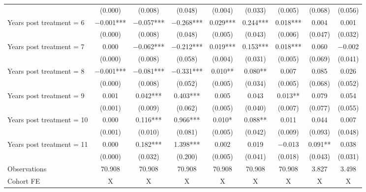 \begin{table}[H]
{\begin{threeparttable}
\begin{tabular}[t]{lcccccccc}
 & (\num{0.000}) & (\num{0.008}) & (\num{0.048}) & (\num{0.004}) & (\num{0.033}) & (\num{0.005}) & (\num{0.068}) & (\num{0.056})\\
Years post treatment = 6 & \num{-0.001}*** & \num{-0.057}*** & \num{-0.268}*** & \num{ 0.029}*** & \num{ 0.244}*** & \num{ 0.018}*** & \num{ 0.004} & \num{ 0.001}\\
 & (\num{0.000}) & (\num{0.008}) & (\num{0.048}) & (\num{0.005}) & (\num{0.043}) & (\num{0.006}) & (\num{0.047}) & (\num{0.032})\\
Years post treatment = 7 & \num{ 0.000} & \num{-0.062}*** & \num{-0.212}*** & \num{ 0.019}*** & \num{ 0.153}*** & \num{ 0.018}*** & \num{ 0.060} & \num{-0.002}\\
 & (\num{0.000}) & (\num{0.008}) & (\num{0.058}) & (\num{0.004}) & (\num{0.031}) & (\num{0.005}) & (\num{0.069}) & (\num{0.041})\\
Years post treatment = 8 & \num{-0.001}*** & \num{-0.081}*** & \num{-0.331}*** & \num{ 0.010}** & \num{ 0.080}** & \num{ 0.007} & \num{ 0.085} & \num{ 0.026}\\
 & (\num{0.000}) & (\num{0.008}) & (\num{0.052}) & (\num{0.005}) & (\num{0.034}) & (\num{0.005}) & (\num{0.068}) & (\num{0.052})\\
Years post treatment = 9 & \num{ 0.001} & \num{ 0.042}*** & \num{ 0.403}*** & \num{ 0.005} & \num{ 0.043} & \num{ 0.013}** & \num{ 0.079} & \num{ 0.054}\\
 & (\num{0.001}) & (\num{0.009}) & (\num{0.062}) & (\num{0.005}) & (\num{0.040}) & (\num{0.007}) & (\num{0.077}) & (\num{0.055})\\
Years post treatment = 10 & \num{ 0.000} & \num{ 0.116}*** & \num{ 0.966}*** & \num{ 0.010}* & \num{ 0.088}** & \num{ 0.011} & \num{ 0.044} & \num{ 0.007}\\
 & (\num{0.001}) & (\num{0.010}) & (\num{0.081}) & (\num{0.005}) & (\num{0.042}) & (\num{0.009}) & (\num{0.093}) & (\num{0.048})\\
Years post treatment = 11 & \num{ 0.000} & \num{ 0.182}*** & \num{ 1.398}*** & \num{ 0.002} & \num{ 0.019} & \num{-0.013} & \num{ 0.091}** & \num{ 0.038}\\
 & (\num{0.000}) & (\num{0.032}) & (\num{0.200}) & (\num{0.005}) & (\num{0.041}) & (\num{0.018}) & (\num{0.043}) & (\num{0.031})\\
\midrule
Observations & \num{70,908} & \num{70,908} & \num{70,908} & \num{70,908} & \num{70,908} & \num{70,908} & \num{3,827} & \num{3,498}\\
Cohort FE & X & X & X & X & X & X & X & X\\

\end{tabular}
\end{threeparttable}}
\end{table}
